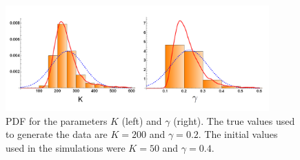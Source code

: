 \documentclass[11pt, a4paper]{article}
\begin{document}
\begin{figure}
    \centering
    \includegraphics[width=0.9\textwidth]{Figs/FigKg.png}
    \caption{PDF for the parameters $K$ (left) and $\gamma$ (right). The true values used to generate the data are $K=200$ and $\gamma = 0.2$. The initial values used in the simulations were $K=50$ and $\gamma = 0.4$.}
    \label{fig:K_distr}
\end{figure}




\end{document}
